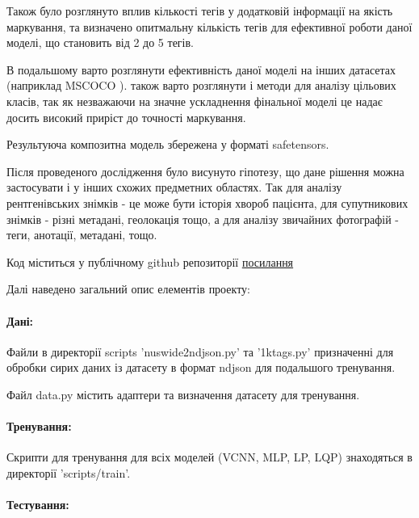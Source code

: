 \documentclass{udstu}
\begin{document}
Також було розглянуто вплив кількості тегів у додатковій інформації на якість маркування, та визначено
опитмальну кількість тегів для ефективної роботи даної моделі, що становить від 2 до 5 тегів.

В подальшому варто розглянути ефективність даної моделі на інших датасетах (наприклад MSCOCO \cite{cocodataset}).
також варто розглянути і методи для аналізу цільових класів, так як незважаючи на
значне ускладнення фінальної моделі це надає досить високий приріст до точності маркування.

Результуюча композитна модель збережена у форматі safetensors.

Після проведеного дослідження було висунуто гіпотезу, що дане рішення можна застосувати
і у інших схожих предметних областях. Так для аналізу рентгенівських знімків - це може бути історія хвороб пацієнта,
для супутникових знімків - різні метадані, геолокація тощо, а для аналізу звичайних фотографій
- теги, анотації, метадані, тощо.

\printbibliography


Код міститься у публічному github репозиторії
\underline{\href{https://github.com/skorodenko/wallpaper\_tagging}{посилання}}

Далі наведено загальний опис елементів проекту:


\paragraph{\textbf{Дані:}\\}

Файли в директорії scripts 'nuswide2ndjson.py' та '1ktags.py' призначенні для обробки
сирих даних із датасету в формат ndjson для подальшого тренування.

Файл data.py містить адаптери та визначення датасету для тренування.


\paragraph{\textbf{Тренування:}\\}

Скрипти для тренування для всіх моделей (VCNN, MLP, LP, LQP) знаходяться в директорії
'scripts/train'.


\paragraph{\textbf{Тестування:}\\}
\end{document}
